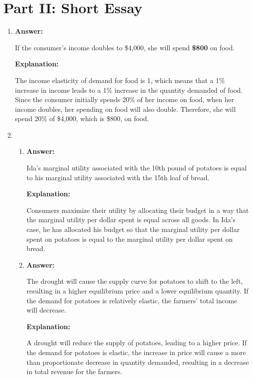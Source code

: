 \documentclass{article}
\begin{document}
\section*{Part II: Short Essay}

\begin{enumerate}
    \item \textbf{Answer:}

          If the consumer's income doubles to \$4,000, she will spend \textbf{\$800} on food.

          \textbf{Explanation:}

          The income elasticity of demand for food is 1, which means that a 1\% increase in income leads to a 1\% increase in the quantity demanded of food. Since the consumer initially spends 20\% of her income on food, when her income doubles, her spending on food will also double. Therefore, she will spend 20\% of \$4,000, which is \$800, on food.

    \item
          \begin{enumerate}
              \item \textbf{Answer:}

                    Ida's marginal utility associated with the 10th pound of potatoes is equal to his marginal utility associated with the 15th loaf of bread.

                    \textbf{Explanation:}

                    Consumers maximize their utility by allocating their budget in a way that the marginal utility per dollar spent is equal across all goods. In Ida's case, he has allocated his budget so that the marginal utility per dollar spent on potatoes is equal to the marginal utility per dollar spent on bread.

              \item \textbf{Answer:}

                    The drought will cause the supply curve for potatoes to shift to the left, resulting in a higher equilibrium price and a lower equilibrium quantity. If the demand for potatoes is relatively elastic, the farmers' total income will decrease.

                    \textbf{Explanation:}

                    A drought will reduce the supply of potatoes, leading to a higher price. If the demand for potatoes is elastic, the increase in price will cause a more than proportionate decrease in quantity demanded, resulting in a decrease in total revenue for the farmers.


\end{enumerate}
\end{enumerate}
\end{document}
